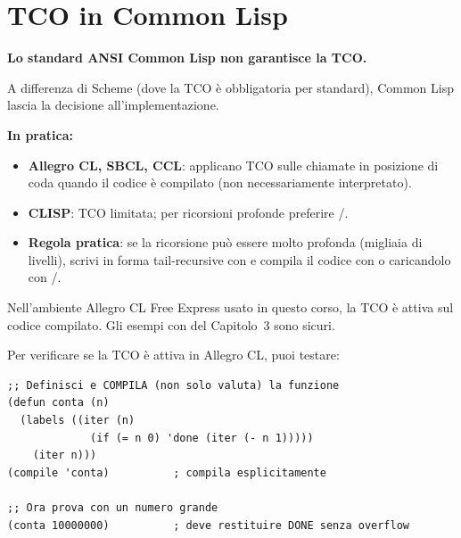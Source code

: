 \section{TCO in Common Lisp}

\begin{confronto}
\textbf{Lo standard ANSI Common Lisp non garantisce la TCO.}

\medskip
A differenza di Scheme (dove la TCO è obbligatoria per standard),
Common Lisp lascia la decisione all'implementazione.

\medskip
\textbf{In pratica:}
\begin{itemize}
  \item \textbf{Allegro CL, SBCL, CCL}: applicano TCO sulle chiamate
        in posizione di coda quando il codice è compilato
        (non necessariamente interpretato).
  \item \textbf{CLISP}: TCO limitata; per ricorsioni profonde
        preferire /.
  \item \textbf{Regola pratica}: se la ricorsione può essere
        molto profonda (migliaia di livelli), scrivi in forma
        tail-recursive con  e compila il codice
        con  o caricandolo con /.
\end{itemize}

\medskip
Nell'ambiente Allegro CL Free Express usato in questo corso,
la TCO è attiva sul codice compilato. Gli esempi con 
del Capitolo~3 sono sicuri.
\end{confronto}

\begin{nota}
Per verificare se la TCO è attiva in Allegro CL, puoi testare:
\begin{lstlisting}
;; Definisci e COMPILA (non solo valuta) la funzione
(defun conta (n)
  (labels ((iter (n)
             (if (= n 0) 'done (iter (- n 1)))))
    (iter n)))
(compile 'conta)          ; compila esplicitamente

;; Ora prova con un numero grande
(conta 10000000)          ; deve restituire DONE senza overflow
\end{lstlisting}
\end{nota}
